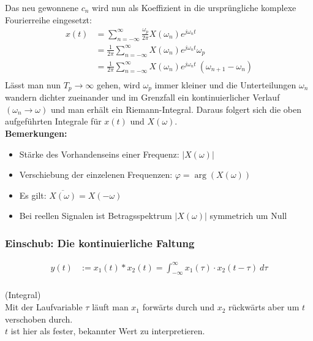 \documentclass[12pt,a4paper]{scrartcl}
\begin{document}
  \noindent Das neu gewonnene $c_n$ wird nun als Koeffizient in die ursprüngliche komplexe Fourierreihe eingesetzt:
  \begin{equation}
    \label{eq:6}
      \begin{split}
      x(t) &= \sum_{n=-\infty}^{\infty}\frac{\omega_p}{2\pi}X(\omega_n)e^{j\omega_n t}\\
      &= \frac{1}{2\pi} \sum_{n=-\infty}^{\infty} X(\omega_n) e^{j\omega_n t} \omega_p \\
      &= \frac{1}{2\pi} \sum_{n=-\infty}^{\infty} X(\omega_n) e^{j\omega_n t} \ (\omega_{n + 1} - \omega_n)  \\
      \end{split}
    \end{equation}
    \noindent Lässt man nun $T_p \to \infty$ gehen, wird $\omega_p$ immer kleiner und die Unterteilungen $\omega_n$ wandern dichter zueinander
    und im Grenzfall ein kontinuierlicher Verlauf $(\omega_ n \to \omega)$ und man erhält ein Riemann-Integral. Daraus folgert sich die oben aufgeführten Integrale für $x(t)$ und $X(\omega)$.\\

    \noindent  \textbf{Bemerkungen:}
    \begin{itemize}
      \item Stärke des Vorhandenseins einer Frequenz: $|X(\omega)|$
      \item Verschiebung der einzelenen Frequenzen: $\varphi = \arg(X(\omega))$
      \item Es gilt: $\overline{X(\omega)} = X(-\omega)$
      \item Bei reellen Signalen ist Betragsspektrum $|X(\omega)|$ symmetrich um Null
    \end{itemize}

    \subsubsection{Einschub: Die kontinuierliche Faltung}
  \label{sec:sub:sub:faltung}

  \begin{equation}
    \label{eq:7}
      \begin{split}
      y(t) &:= x_1 (t) * x_2 (t) = \int_{-\infty}^{\infty} x_1 (\tau) \cdot x_2 (t-\tau)\ d \tau \\
      \end{split}
    \end{equation}
  
    \noindent (Integral)\\
    \noindent Mit der Laufvariable $\tau$ läuft man $x_1$ forwärts durch und $x_2$ rückwärts aber um $t$ verschoben durch. \\
    $t$ ist hier als fester, bekannter Wert zu interpretieren. \\
\end{document}
